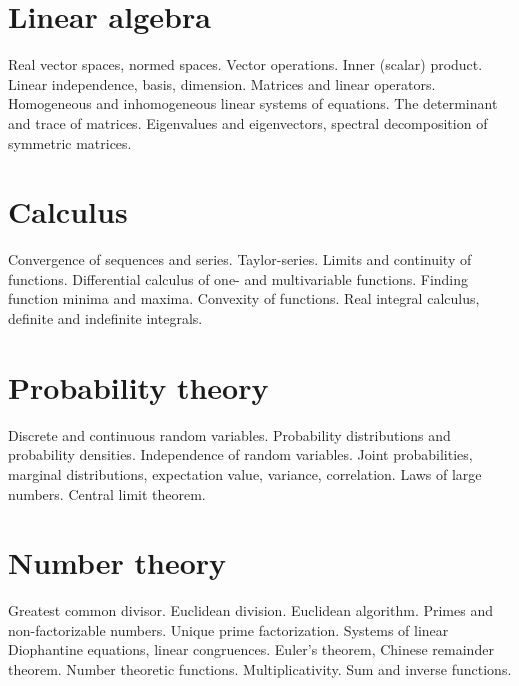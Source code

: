 \documentclass{article}
\begin{document}
\section{Linear algebra}

Real vector spaces, normed spaces. Vector operations. Inner (scalar) product. Linear independence, basis, dimension. Matrices and linear operators. Homogeneous and inhomogeneous linear systems of equations. The determinant and trace of matrices. Eigenvalues and eigenvectors, spectral decomposition of symmetric matrices.


\section{Calculus}

Convergence of sequences and series. Taylor-series. Limits and continuity of functions. Differential calculus of one- and multivariable functions. Finding function minima and maxima. Convexity of functions. Real integral calculus, definite and indefinite integrals.


\section{Probability theory}

Discrete and continuous random variables. Probability distributions and probability densities. Independence of random variables. Joint probabilities, marginal distributions, expectation value, variance, correlation. Laws of large numbers. Central limit theorem.


\section{Number theory}

Greatest common divisor. Euclidean division. Euclidean algorithm. Primes and non-factorizable numbers. Unique prime factorization. Systems of linear Diophantine equations, linear congruences. Euler’s theorem, Chinese remainder theorem. Number theoretic functions. Multiplicativity. Sum and inverse functions.
\end{document}
